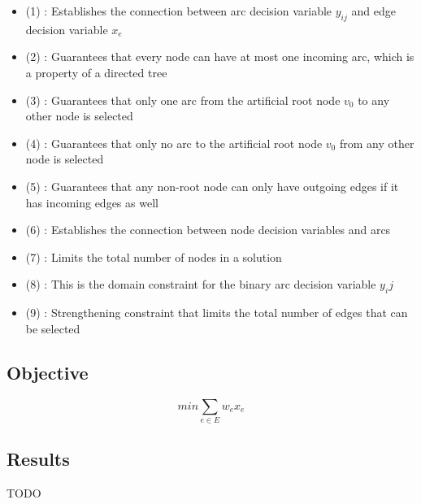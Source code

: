 \begin{itemize}
	\item (1) : Establishes the connection between arc decision variable $y_{ij}$ and edge decision variable $x_e$
	\item (2) : Guarantees that every node can have at most one incoming arc, which is a property of a directed tree
	\item (3) : Guarantees that only one arc from the artificial root node $v_0$ to any other node is selected
   	\item (4) : Guarantees that only no arc to the artificial root node $v_0$ from any other node is selected
   	\item (5) : Guarantees that any non-root node can only have outgoing edges if it has incoming edges as well
   	\item (6) : Establishes the connection between node decision variables and arcs
   	\item (7) : Limits the total number of nodes in a solution
	\item (8) : This is the domain constraint for the binary arc decision variable $y_ij$
	\item (9) : Strengthening constraint that limits the total number of edges that can be selected 
\end{itemize}

\subsection{Objective}

\[ min \sum_{e \in E}w_ex_e \]

\subsection{Results} \label{4:4}

TODO


